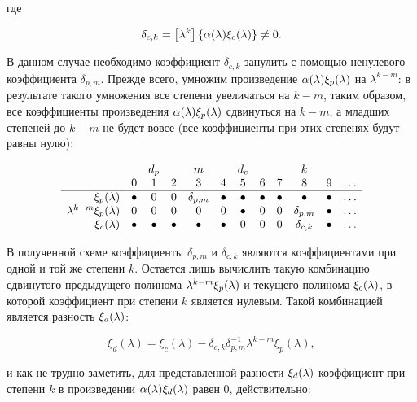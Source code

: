 где

	$$ \delta_{c,k} = \left [ \lambda^{k} \right ] \left \{ \alpha (\lambda) \xi_c (\lambda) \right \} \neq 0. $$

В данном случае необходимо коэффициент $\delta_{c,k}$ занулить с помощью ненулевого коэффициента $\delta_{p,m}$. Прежде всего, умножим произведение
$\alpha (\lambda) \xi_p (\lambda)$ на $\lambda^{k-m}$: в результате такого умножения все степени увеличаться на $k-m$, таким образом,
все коэффициенты произведения $\alpha (\lambda) \xi_p (\lambda)$ сдвинуться на $k-m$, а младших степеней до $k-m$ не будет
вовсе (все коэффициенты при этих степенях будут равны нулю):

	$$
		\begin{array}{rccccccccccc}
			                                 &         & d_p     &         & m            &         & d_c     &         &         & k            & \\
			                                 & 0       & 1       & 2       & 3            & 4       & 5       & 6       & 7       & 8            & 9       & \dots \\
			\hline
			\xi_p (\lambda)               & \bullet & 0       & 0       & \delta_{p,m} & \bullet & \bullet & \bullet & \bullet & \bullet      & \bullet & \dots \\
			\lambda^{k-m} \xi_p (\lambda) & 0       & 0       & 0       & 0            & 0       & \bullet & 0       & 0       & \delta_{p,m} & \bullet & \dots \\
			\xi_c (\lambda)               & \bullet & \bullet & \bullet & \bullet      & \bullet & 0       & 0       & 0       & \delta_{c,k} & \bullet & \dots \\
		\end{array}
	$$

В полученной схеме коэффициенты $\delta_{p,m}$ и $\delta_{c,k}$ являются коэффициентами при одной и той же степени $k$.
Остается лишь вычислить такую комбинацию сдвинутого предыдущего полинома $\lambda^{k-m} \xi_p (\lambda)$ и текущего полинома
$\xi_c (\lambda)$, в которой коэффициент при степени $k$ является нулевым. Такой комбинацией является разность $\xi_d (\lambda)$:

	$$ \xi_d(\lambda) = \xi_c(\lambda) - \delta_{c,k} \delta_{p,m}^{-1} \lambda^{k-m} \xi_p(\lambda), $$

и как не трудно заметить, для представленной разности $\xi_d (\lambda)$ коэффициент при степени $k$ в произведении
$\alpha (\lambda) \xi_d (\lambda)$ равен 0, действительно:

